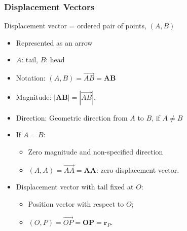 \begin{frame}
 \frametitle{Displacement Vectors}

\pause
  Displacement vector = ordered pair of points, $(A,B)$


\begin{itemize}
 \item Represented as an arrow
 \item $A$: tail, $B$: head
 \item Notation: $(A,B) = \overrightarrow{AB} = \textbf{AB}$
  \item Magnitude: $|\textbf{AB}| = |\overrightarrow{AB}|$. 
  \item Direction: Geometric direction from $A$ to $B$, if $A\neq B$ 
  \item If $A=B$:
  \begin{itemize}
    \item Zero magnitude and non-specified direction
    \item $(A,A) = \overrightarrow{AA} = \textbf{AA}$: zero displacement vector.
  \end{itemize}
  \item Displacement vector with tail fixed at $O$:
  \begin{itemize}
    \item Position vector with respect to $O$;
    \item $(O,P) = \overrightarrow{OP} = \textbf{OP} = \textbf{r}_P$.
  \end{itemize}
\end{itemize}

\end{frame}